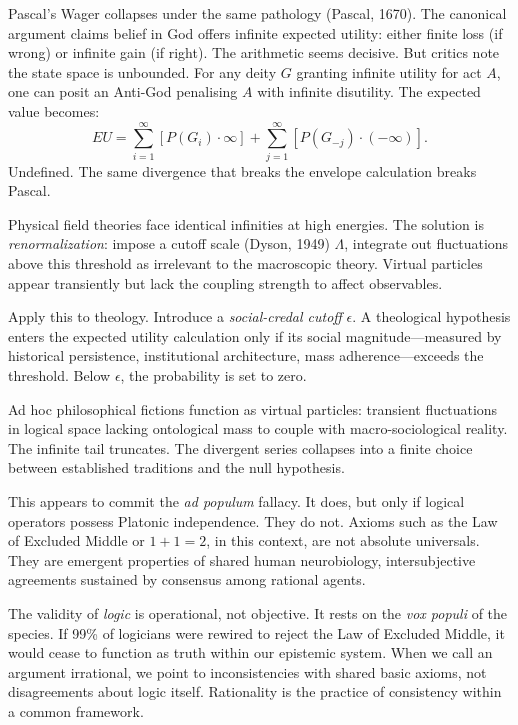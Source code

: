 \begin{commentary}
Pascal's Wager collapses under the same pathology (Pascal, 1670). The canonical argument claims belief in God offers infinite expected utility: either finite loss (if wrong) or infinite gain (if right). The arithmetic seems decisive. But critics note the state space is unbounded. For any deity $G$ granting infinite utility for act $A$, one can posit an Anti-God penalising $A$ with infinite disutility. The expected value becomes:
\[
EU = \sum_{i=1}^{\infty} [P(G_i) \cdot \infty] + \sum_{j=1}^{\infty} [P(G_{-j}) \cdot (-\infty)].
\]
Undefined. The same divergence that breaks the envelope calculation breaks Pascal.

Physical field theories face identical infinities at high energies. The solution is \emph{renormalization}: impose a cutoff scale (Dyson, 1949) $\Lambda$, integrate out fluctuations above this threshold as irrelevant to the macroscopic theory. Virtual particles appear transiently but lack the coupling strength to affect observables.

Apply this to theology. Introduce a \emph{social-credal cutoff} $\epsilon$. A theological hypothesis enters the expected utility calculation only if its social magnitude—measured by historical persistence, institutional architecture, mass adherence—exceeds the threshold. Below $\epsilon$, the probability is set to zero.

Ad hoc philosophical fictions function as virtual particles: transient fluctuations in logical space lacking ontological mass to couple with macro-sociological reality. The infinite tail truncates. The divergent series collapses into a finite choice between established traditions and the null hypothesis.

This appears to commit the \emph{\textit{ad populum}} fallacy. It does, but only if logical operators possess Platonic independence. They do not. Axioms such as the Law of Excluded Middle or $1+1=2$, in this context, are not absolute universals. They are emergent properties of shared human neurobiology, intersubjective agreements sustained by consensus among rational agents.

The validity of \emph{logic} is operational, not objective. It rests on the \emph{vox populi} of the species. If 99\% of logicians were rewired to reject the Law of Excluded Middle, it would cease to function as truth within our epistemic system. When we call an argument irrational, we point to inconsistencies with shared basic axioms, not disagreements about logic itself. Rationality is the practice of consistency within a common framework.


\end{commentary}
